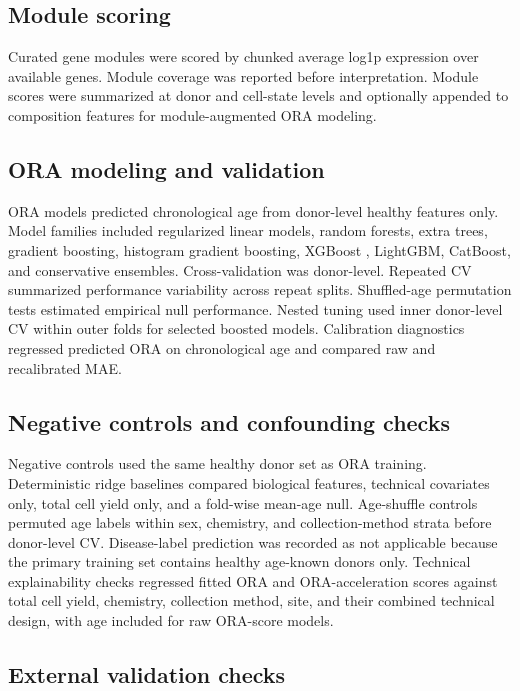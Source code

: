 \documentclass[11pt]{article}
\begin{document}
\subsection{Module scoring}

Curated gene modules were scored by chunked average log1p expression over available genes. Module coverage was reported before interpretation. Module scores were summarized at donor and cell-state levels and optionally appended to composition features for module-augmented ORA modeling.

\subsection{ORA modeling and validation}

ORA models predicted chronological age from donor-level healthy features only. Model families included regularized linear models, random forests, extra trees, gradient boosting, histogram gradient boosting, XGBoost \citep{xgboost2016}, LightGBM, CatBoost, and conservative ensembles. Cross-validation was donor-level. Repeated CV summarized performance variability across repeat splits. Shuffled-age permutation tests estimated empirical null performance. Nested tuning used inner donor-level CV within outer folds for selected boosted models. Calibration diagnostics regressed predicted ORA on chronological age and compared raw and recalibrated MAE.

\subsection{Negative controls and confounding checks}

Negative controls used the same healthy donor set as ORA training. Deterministic ridge baselines compared biological features, technical covariates only, total cell yield only, and a fold-wise mean-age null. Age-shuffle controls permuted age labels within sex, chemistry, and collection-method strata before donor-level CV. Disease-label prediction was recorded as not applicable because the primary training set contains healthy age-known donors only. Technical explainability checks regressed fitted ORA and ORA-acceleration scores against total cell yield, chemistry, collection method, site, and their combined technical design, with age included for raw ORA-score models.

\subsection{External validation checks}
\end{document}
